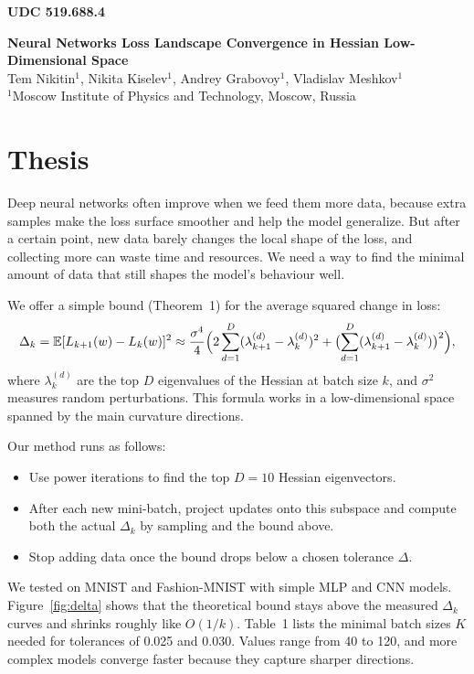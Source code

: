 \documentclass[a4paper,12pt]{article}
\begin{document}
\noindent\textbf{UDC 519.688.4}\\[2ex]
\begin{center}
  {\LARGE \textbf{Neural Networks Loss Landscape Convergence in Hessian Low-Dimensional Space}}\\[2ex]
  Tem Nikitin$^{1}$, Nikita Kiselev$^{1}$, Andrey Grabovoy$^{1}$, Vladislav Meshkov$^{1}$\\[1ex]
  $^{1}$Moscow Institute of Physics and Technology, Moscow, Russia
\end{center}

\section*{Thesis}

Deep neural networks often improve when we feed them more data, because extra samples make the loss surface smoother and help the model generalize. But after a certain point, new data barely changes the local shape of the loss, and collecting more can waste time and resources. We need a way to find the minimal amount of data that still shapes the model’s behaviour well.

We offer a simple bound (Theorem~1) for the average squared change in loss:
$$
\Delta_k = \mathbb{E}[L_{k+1}(w) - L_k(w)]^2 \approx \frac{\sigma^4}{4} \Bigl(2\sum_{d=1}^D(\lambda_{k+1}^{(d)} - \lambda_k^{(d)})^2 + \bigl(\sum_{d=1}^D(\lambda_{k+1}^{(d)} - \lambda_k^{(d)})\bigr)^2\Bigr),
$$
where $\lambda_k^{(d)}$ are the top $D$ eigenvalues of the Hessian at batch size $k$, and $\sigma^2$ measures random perturbations. This formula works in a low-dimensional space spanned by the main curvature directions.

Our method runs as follows:
\begin{itemize}
  \item Use power iterations to find the top $D=10$ Hessian eigenvectors.
  \item After each new mini-batch, project updates onto this subspace and compute both the actual $\Delta_k$ by sampling and the bound above.
  \item Stop adding data once the bound drops below a chosen tolerance $\Delta$.
\end{itemize}

We tested on MNIST and Fashion-MNIST with simple MLP and CNN models. Figure~\ref{fig:delta} shows that the theoretical bound stays above the measured $\Delta_k$ curves and shrinks roughly like $O(1/k)$. Table~1 lists the minimal batch sizes $K$ needed for tolerances of 0.025 and 0.030. Values range from 40 to 120, and more complex models converge faster because they capture sharper directions.
\end{document}

